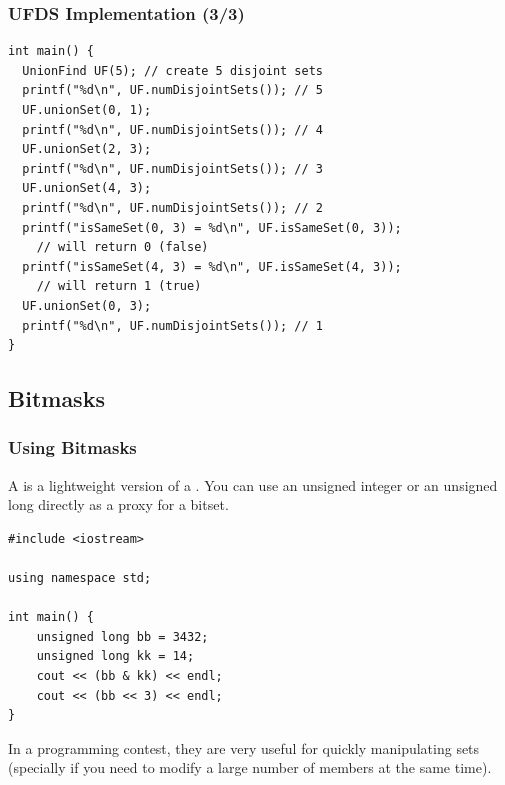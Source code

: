 \documentclass{beamer}
\begin{document}
\begin{frame}[fragile]
  \frametitle{UFDS Implementation (3/3)}

  {\small
\begin{verbatim}
int main() {
  UnionFind UF(5); // create 5 disjoint sets
  printf("%d\n", UF.numDisjointSets()); // 5
  UF.unionSet(0, 1);
  printf("%d\n", UF.numDisjointSets()); // 4
  UF.unionSet(2, 3);
  printf("%d\n", UF.numDisjointSets()); // 3
  UF.unionSet(4, 3);
  printf("%d\n", UF.numDisjointSets()); // 2
  printf("isSameSet(0, 3) = %d\n", UF.isSameSet(0, 3)); 
    // will return 0 (false)
  printf("isSameSet(4, 3) = %d\n", UF.isSameSet(4, 3)); 
    // will return 1 (true)
  UF.unionSet(0, 3);
  printf("%d\n", UF.numDisjointSets()); // 1
}
\end{verbatim}
}
  
\end{frame}


\subsection{Bitmasks}

\begin{frame}[fragile]
  \frametitle{Using Bitmasks}
  {\smaller
  A  is a lightweight version of a
  . You can use an unsigned integer or an unsigned
  long directly as a proxy for a bitset.

  \begin{block}{}
\begin{verbatim}
#include <iostream>

using namespace std;

int main() {
    unsigned long bb = 3432;
    unsigned long kk = 14;
    cout << (bb & kk) << endl;
    cout << (bb << 3) << endl;
}
\end{verbatim}
  \end{block}

  In a programming contest, they are very useful for quickly
  manipulating sets (specially if you need to modify a large number of
  members at the same time).
  }
\end{frame}
\end{document}
